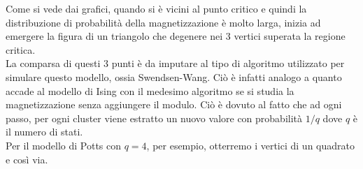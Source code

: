 \begin{center}
\begin{figure}[h!]
{}
\end{figure}
\end{center}


Come si vede dai grafici, quando si è vicini al punto critico e quindi la distribuzione di probabilità della magnetizzazione è molto larga, inizia ad emergere la figura di un triangolo che degenere nei 3 vertici superata la regione critica.\\
La comparsa di questi 3 punti è da imputare al tipo di algoritmo utilizzato per simulare questo modello, ossia Swendsen-Wang.
Ciò è infatti analogo a quanto accade al modello di Ising con il medesimo algoritmo se si studia la magnetizzazione senza aggiungere il modulo. Ciò è dovuto al fatto che ad ogni passo, per ogni cluster viene estratto un nuovo valore con probabilità $1/q$ dove $q$ è il numero di stati.\\
Per il modello di Potts con $q=4$, per esempio, otterremo i vertici di un quadrato e così via.


\newpage
